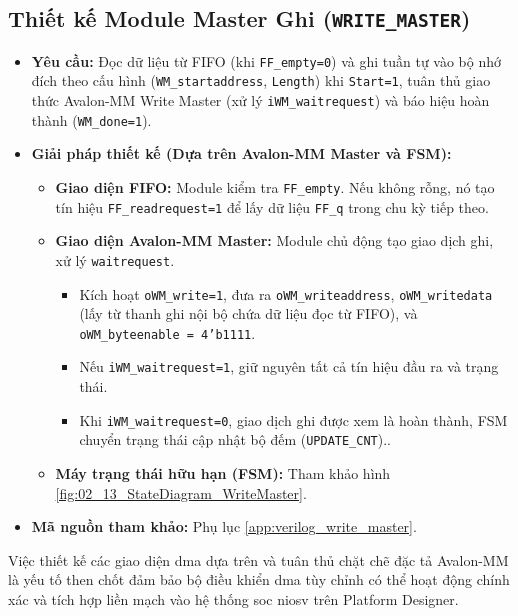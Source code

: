 \subsection{Thiết kế Module Master Ghi (\texttt{WRITE\_MASTER})}
\begin{itemize}
    \item \textbf{Yêu cầu:} Đọc dữ liệu từ FIFO (khi \texttt{FF\_empty=0}) và ghi tuần tự vào bộ nhớ đích theo cấu hình (\texttt{WM\_startaddress}, \texttt{Length}) khi \texttt{Start=1}, tuân thủ giao thức Avalon-MM Write Master (xử lý \texttt{iWM\_waitrequest}) và báo hiệu hoàn thành (\texttt{WM\_done=1}).
    \item \textbf{Giải pháp thiết kế (Dựa trên Avalon-MM Master và FSM):}
        \begin{itemize}
            \item \textbf{Giao diện FIFO:} Module kiểm tra \texttt{FF\_empty}. Nếu không rỗng, nó tạo tín hiệu \texttt{FF\_readrequest=1} để lấy dữ liệu \texttt{FF\_q} trong chu kỳ tiếp theo.
            \item \textbf{Giao diện Avalon-MM Master:} Module chủ động tạo giao dịch ghi, xử lý \texttt{waitrequest}.
            \begin{itemize}
                \item Kích hoạt \texttt{oWM\_write=1}, đưa ra \texttt{oWM\_writeaddress}, \texttt{oWM\_writedata} (lấy từ thanh ghi nội bộ chứa dữ liệu đọc từ FIFO), và \texttt{oWM\_byteenable = 4'b1111}.
                \item Nếu \texttt{iWM\_waitrequest=1}, giữ nguyên tất cả tín hiệu đầu ra và trạng thái.
                \item Khi \texttt{iWM\_waitrequest=0}, giao dịch ghi được xem là hoàn thành, FSM chuyển trạng thái cập nhật bộ đếm (\texttt{UPDATE\_CNT})..
            \end{itemize}
            \item \textbf{Máy trạng thái hữu hạn (FSM):} Tham khảo hình \ref{fig:02_13_StateDiagram_WriteMaster}.
        \end{itemize}
    \item \textbf{Mã nguồn tham khảo:} Phụ lục \ref{app:verilog_write_master}.
\end{itemize}

Việc thiết kế các giao diện \acrshort{dma} dựa trên và tuân thủ chặt chẽ đặc tả Avalon-MM \cite{avalon_mm_transfer} là yếu tố then chốt đảm bảo bộ điều khiển \acrshort{dma} tùy chỉnh có thể hoạt động chính xác và tích hợp liền mạch vào hệ thống \acrshort{soc} \acrshort{niosv} trên Platform Designer.

